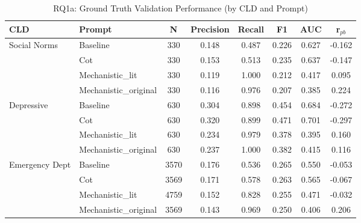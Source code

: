 \begin{table}[htbp]
\centering
\caption{RQ1a: Ground Truth Validation Performance (by CLD and Prompt)}
\label{tab:rq1a_gt_main}
\begin{tabular}{llcccccc}
\toprule
\textbf{CLD} & \textbf{Prompt} & \textbf{N} & \textbf{Precision} & \textbf{Recall} & \textbf{F1} & \textbf{AUC} & \textbf{r$_{pb}$} \\
\midrule
Social Norms & Baseline & 330 & 0.148 & 0.487 & 0.226 & 0.627 & -0.162 \\
 & Cot & 330 & 0.153 & 0.513 & 0.235 & 0.637 & -0.147 \\
 & Mechanistic_lit & 330 & 0.119 & 1.000 & 0.212 & 0.417 & 0.095 \\
 & Mechanistic_original & 330 & 0.116 & 0.976 & 0.207 & 0.385 & 0.224 \\
\midrule
Depressive & Baseline & 630 & 0.304 & 0.898 & 0.454 & 0.684 & -0.272 \\
 & Cot & 630 & 0.320 & 0.899 & 0.471 & 0.701 & -0.297 \\
 & Mechanistic_lit & 630 & 0.234 & 0.979 & 0.378 & 0.395 & 0.160 \\
 & Mechanistic_original & 630 & 0.237 & 1.000 & 0.382 & 0.415 & 0.116 \\
\midrule
Emergency Dept & Baseline & 3570 & 0.176 & 0.536 & 0.265 & 0.550 & -0.053 \\
 & Cot & 3569 & 0.171 & 0.578 & 0.263 & 0.565 & -0.067 \\
 & Mechanistic_lit & 4759 & 0.152 & 0.828 & 0.255 & 0.471 & -0.032 \\
 & Mechanistic_original & 3569 & 0.143 & 0.969 & 0.250 & 0.406 & 0.206 \\
\midrule
\bottomrule
\end{tabular}
\end{table}